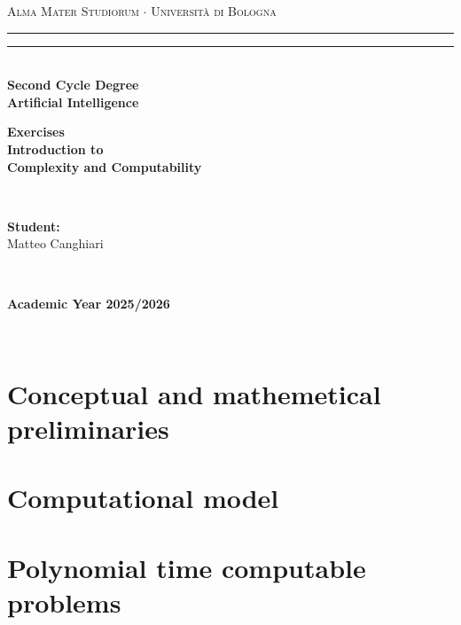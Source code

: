 \documentclass[12pt,a4paper,oneside]{book}
\begin{document}
\pagestyle{empty}
\begin{titlepage}
\begin{center}
    {{\Large{\textsc{Alma Mater Studiorum $\cdot$ Università di Bologna}}}}
    \rule[0.1cm]{\textwidth}{0.1mm}
    \rule[0.5cm]{\textwidth}{0.6mm}\\
    {\small{\bf Second Cycle Degree\\
    Artificial Intelligence}}
\end{center}

\vspace{45mm}

\begin{center}
    \textbf{Exercises \\ Introduction to \\ Complexity and Computability}
\end{center}

\vspace{60mm}
\par
\noindent
\begin{minipage}[t]{0.04\textwidth}
~
\end{minipage}
\begin{minipage}[t]{0.4\textwidth}
{{\textbf{Student:}\\
Matteo Canghiari}}
\end{minipage}
\begin{minipage}[t]{0.04\textwidth}
~
\end{minipage}

\vspace{30mm}

\begin{center}
    {\large{\bf Academic Year 2025/2026}}
\end{center}
\end{titlepage}

\restoregeometry

\pagestyle{empty}
\newpage~\newpage
\thispagestyle{empty}

\clearpage
{}
\pagestyle{plain}

\chapter{Conceptual and mathemetical preliminaries}

\label{c_1}

\chapter{Computational model}

\label{c_2}

\chapter{Polynomial time computable problems}

\label{c_3}
\end{document}
